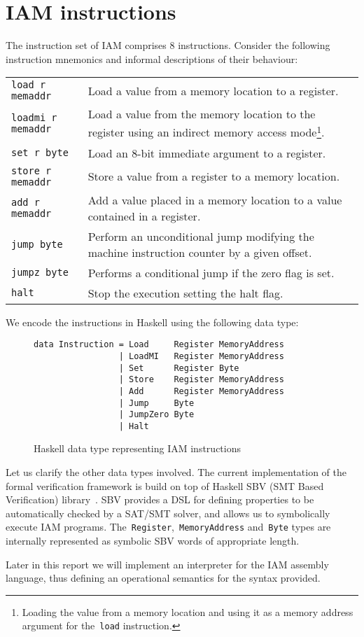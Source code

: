 \section{IAM instructions}
\label{Instructions}

The instruction set of IAM comprises 8 instructions. Consider the following
instruction mnemonics and informal descriptions of their behaviour:

\begin{longtable}{l|p{9cm}}
\texttt{load r memaddr}     & Load a value from a memory location to a register.\\
\texttt{loadmi r memaddr}   & Load a value from the memory location to the register using
an indirect memory access mode\footnote{Loading the value from a memory location and using it as
a memory address argument for the~\texttt{load} instruction.}.\\
\texttt{set      r byte   } & Load an 8-bit immediate argument to a register.\\
\texttt{store    r memaddr} & Store a value from a register to a memory location.\\
\texttt{add      r memaddr} & Add a value placed in a memory location to a value contained in a register.\\
\texttt{jump     byte     } & Perform an unconditional jump modifying the machine
instruction counter by a given offset.\\
\texttt{jumpz    byte     } & Performs a conditional jump if the zero flag is set.\\
\texttt{halt              } & Stop the execution setting the halt flag.
\end{longtable}

We encode the instructions in Haskell using the following data type:

\begin{figure}[H]
\begin{verbatim}
data Instruction = Load     Register MemoryAddress
                 | LoadMI   Register MemoryAddress
                 | Set      Register Byte
                 | Store    Register MemoryAddress
                 | Add      Register MemoryAddress
                 | Jump     Byte
                 | JumpZero Byte
                 | Halt
\end{verbatim}
\caption{Haskell data type representing IAM instructions}
\label{Instruction}
\end{figure}

Let us clarify the other data types involved. The current implementation of the formal verification
framework is build on top of Haskell SBV (SMT Based Verification)
library~\cite{SBV}. SBV provides a DSL for defining properties to be automatically
checked by a SAT/SMT solver, and allows us to symbolically execute IAM programs.
The~\texttt{Register},~\texttt{MemoryAddress}
and~\texttt{Byte} types are internally represented as symbolic
SBV words of appropriate length.

Later in this report we will implement an interpreter for the IAM assembly language,
thus defining an operational semantics for the syntax provided.
